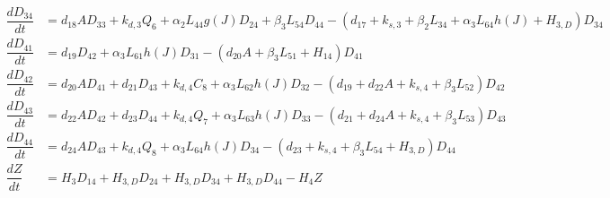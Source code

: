 \begin{align*}
\dfrac{dD_{34}}{dt} & =d_{18}AD_{33}+k_{d,3}Q_{6}+\alpha_{2}L_{44}g\left(J\right)D_{24}+\beta_{3}L_{54}D_{44}-\left(d_{17}+k_{s,3}+\beta_{2}L_{34}+\alpha_{3}L_{64}h\left(J\right)+H_{3,D}\right)D_{34}\\
\dfrac{dD_{41}}{dt} & =d_{19}D_{42}+\alpha_{3}L_{61}h\left(J\right)D_{31}-\left(d_{20}A+\beta_{3}L_{51}+H_{14}\right)D_{41}\\
\dfrac{dD_{42}}{dt} & =d_{20}AD_{41}+d_{21}D_{43}+k_{d,4}C_{8}+\alpha_{3}L_{62}h\left(J\right)D_{32}-\left(d_{19}+d_{22}A+k_{s,4}+\beta_{3}L_{52}\right)D_{42}\\
\dfrac{dD_{43}}{dt} & =d_{22}AD_{42}+d_{23}D_{44}+k_{d,4}Q_{7}+\alpha_{3}L_{63}h\left(J\right)D_{33}-\left(d_{21}+d_{24}A+k_{s,4}+\beta_{3}L_{53}\right)D_{43}\\
\dfrac{dD_{44}}{dt} & =d_{24}AD_{43}+k_{d,4}Q_{8}+\alpha_{3}L_{64}h\left(J\right)D_{34}-\left(d_{23}+k_{s,4}+\beta_{3}L_{54}+H_{3,D}\right)D_{44}\\
\dfrac{dZ}{dt} & =H_{3}D_{14}+H_{3,D}D_{24}+H_{3,D}D_{34}+H_{3,D}D_{44}-H_{4}Z
\end{align*}
